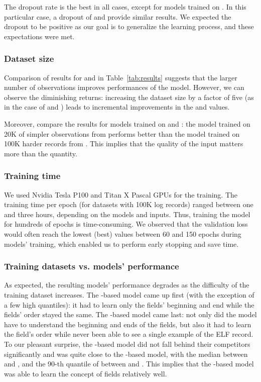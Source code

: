 \documentclass{article}
\begin{document}
The dropout rate  is the best in all cases, except for models trained on . In this particular case, a dropout of  and  provide similar results. We expected the dropout to be positive as our goal is to generalize the learning process, and these expectations were met. 


\subsubsection{Dataset size}
Comparison of results for  and  in Table~\ref{tab:results} suggests that the larger number of observations improves performances of the model. However,  we can observe the diminishing returns: increasing the dataset size by a factor of five (as in the case of  and ) leads to incremental improvements in the  and  values. 

Moreover, compare the results for models trained on  and : the model trained on 20K of simpler observations from  performs better than the model trained on 100K harder records from . This implies that the quality of the input matters more than the quantity. 


\subsubsection{Training time}
We used Nvidia Tesla P100 and Titan X Pascal GPUs for the training. The training time per epoch (for datasets with 100K log records) ranged between one and three hours, depending on the models and inputs. Thus, training the model for hundreds of epochs is time-consuming. We observed that the validation loss would often reach the lowest (best) values between 60 and 150 epochs during models' training, which enabled us to perform early stopping and save time.

\subsubsection{Training datasets vs. models' performance} As expected, the resulting models' performance degrades as the difficulty of the training dataset increases. The -based model came up first (with the exception of a few high quantiles): it had to learn only the fields' beginning and end while the fields' order stayed the same. The -based model came last: not only did the model have to understand the beginning and ends of the fields, but also it had to learn the field's order while never been able to see a single example of the ELF record. To our pleasant surprise, the -based model did not fall behind their competitors significantly and was quite close to the -based model, with the median  between  and  , and the 90-th quantile of  between  and  . This implies that the -based model was able to learn the concept of fields relatively well.
\end{document}
